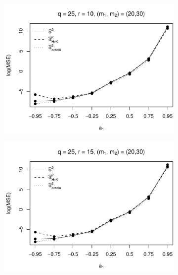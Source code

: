 \begin{figure}[p]
\begin{subfigure}[b]{0.45\textwidth}
\includegraphics[width=\textwidth]{Plots/Robustness/MSE_lrv_T=500_slope=1_(q,K1,K2,M1,M2)=(25,2,10,20,30).pdf}
\end{subfigure}
\hspace{0.25cm}
\begin{subfigure}[b]{0.45\textwidth}
\includegraphics[width=\textwidth]{Plots/Robustness/MSE_lrv_T=500_slope=1_(q,K1,K2,M1,M2)=(25,2,15,20,30).pdf}
\end{subfigure}


\end{figure}
